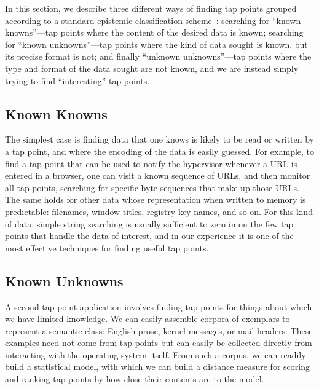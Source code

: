 In this section, we describe three different ways of finding tap points
grouped according to a standard epistemic classification
scheme~\cite{Rumsfeld:2002}: searching for ``known knowns''---tap points
where the content of the desired data is known; searching for ``known
unknowns''---tap points where the kind of data sought is known, but its
precise format is not; and finally ``unknown unknowns''---tap points
where the type and format of the data sought are not known, and we are
instead simply trying to find ``interesting'' tap points.

\subsection{Known Knowns}

The simplest case is finding data that one knows is likely to be read or
written by a tap point, and where the encoding of the data is easily
guessed. For example, to find a tap point that can be used to notify
the hypervisor whenever a URL is entered in a browser, one can visit a
known sequence of URLs, and then monitor all tap points, searching for
specific byte sequences that make up those URLs. The same holds for
other data whose representation when written to memory is predictable:
filenames, window titles, registry key names, and so on. For this kind
of data, simple string searching is usually sufficient to zero in on the
few tap points that handle the data of interest, and in our experience
it is one of the most effective techniques for finding useful tap
points.

\subsection{Known Unknowns}
\label{sec:technical:subsec:knownunk}

A second tap point application involves finding tap points for things
about which we have limited knowledge.
We can easily assemble corpora of exemplars to represent a semantic
class: English prose, kernel messages, or mail headers. These examples
need not come from tap points but can easily be collected directly from
interacting with the operating system itself. From such a corpus, we can
readily build a statistical model, with which we can build a distance
measure for scoring and ranking tap points by how close their contents
are to the model.




